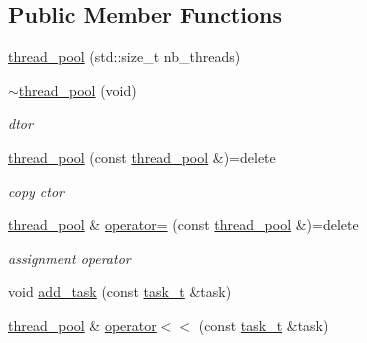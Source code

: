 \subsection*{Public Member Functions}
\begin{DoxyCompactItemize}
\item 
\hyperlink{classtacopie_1_1utils_1_1thread__pool_aa0068f000b8ecb21b2b0a0c50f77877c}{thread\+\_\+pool} (std\+::size\+\_\+t nb\+\_\+threads)
\item 
\mbox{\label{classtacopie_1_1utils_1_1thread__pool_accddfc6fad613b0c6d407028799abfc5}} 
\hyperlink{classtacopie_1_1utils_1_1thread__pool_accddfc6fad613b0c6d407028799abfc5}{$\sim$thread\+\_\+pool} (void)
\begin{DoxyCompactList}\small\item\em dtor \end{DoxyCompactList}\item 
\mbox{\label{classtacopie_1_1utils_1_1thread__pool_a63a850c39d21058eda9d655bb7eff452}} 
\hyperlink{classtacopie_1_1utils_1_1thread__pool_a63a850c39d21058eda9d655bb7eff452}{thread\+\_\+pool} (const \hyperlink{classtacopie_1_1utils_1_1thread__pool}{thread\+\_\+pool} \&)=delete
\begin{DoxyCompactList}\small\item\em copy ctor \end{DoxyCompactList}\item 
\mbox{\label{classtacopie_1_1utils_1_1thread__pool_aa0077461da4da6ba3f4dcac029351234}} 
\hyperlink{classtacopie_1_1utils_1_1thread__pool}{thread\+\_\+pool} \& \hyperlink{classtacopie_1_1utils_1_1thread__pool_aa0077461da4da6ba3f4dcac029351234}{operator=} (const \hyperlink{classtacopie_1_1utils_1_1thread__pool}{thread\+\_\+pool} \&)=delete
\begin{DoxyCompactList}\small\item\em assignment operator \end{DoxyCompactList}\item 
void \hyperlink{classtacopie_1_1utils_1_1thread__pool_a450bee2b7b2cd0aa0bc3935c8adc9ace}{add\+\_\+task} (const \hyperlink{classtacopie_1_1utils_1_1thread__pool_a8ae8886fdeaa8e5c0abad12626a47296}{task\+\_\+t} \&task)
\item 
\hyperlink{classtacopie_1_1utils_1_1thread__pool}{thread\+\_\+pool} \& \hyperlink{classtacopie_1_1utils_1_1thread__pool_afb7befd9fa5f1fbd44423fddc8cbc5d3}{operator$<$$<$} (const \hyperlink{classtacopie_1_1utils_1_1thread__pool_a8ae8886fdeaa8e5c0abad12626a47296}{task\+\_\+t} \&task)

\end{DoxyCompactItemize}
